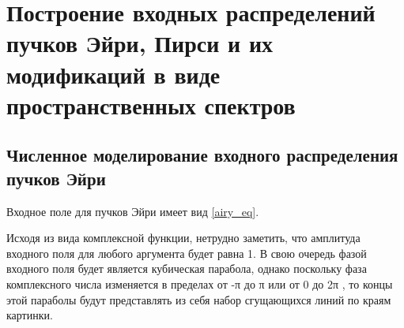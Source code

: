     \section[Построение входных распределений пучков Эйри, Пирси и их модификаций в виде пространственных спектров]{\nohyphens{Построение входных распределений пучков Эйри, Пирси и их модификаций в виде пространственных спектров}}{


    \vspace{-0.2cm}
    \subsection[Численное моделирование входного распределения пучков Эйри]{\nohyphens{Численное моделирование входного распределения пучков Эйри}}

    \vspace{-0.3cm}
    Входное поле для пучков Эйри имеет вид \eqref{airy_eq}.

    Исходя из вида комплексной функции, нетрудно заметить, что амплитуда
    входного поля для любого аргумента будет равна 1. В свою очередь фазой
    входного поля будет является кубическая парабола, однако поскольку фаза
    комплексного числа изменяется в пределах от -π до π или от 0 до 2π , то концы
    этой параболы будут представлять из себя набор сгущающихся линий по краям
    картинки.

}

